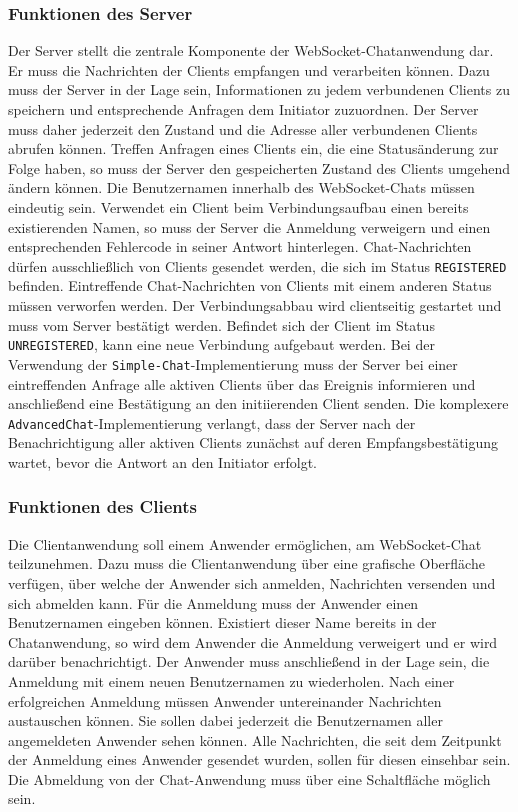 \documentclass[11pt,a4paper,titlepage]{scrartcl}
\numberwithin{equation}{section}
\begin{document}
\subsubsection*{Funktionen des Server}
Der Server stellt die zentrale Komponente der WebSocket-Chatanwendung dar. Er muss die Nachrichten der Clients empfangen und verarbeiten können. Dazu muss der Server in der Lage sein, Informationen zu jedem verbundenen Clients zu speichern und entsprechende Anfragen dem Initiator zuzuordnen. Der Server muss daher jederzeit den Zustand und die Adresse aller verbundenen Clients abrufen können. Treffen Anfragen eines Clients ein, die eine Statusänderung zur Folge haben, so muss der Server den gespeicherten Zustand des Clients umgehend ändern können. Die Benutzernamen innerhalb des WebSocket-Chats müssen eindeutig sein. Verwendet ein Client beim Verbindungsaufbau einen bereits existierenden Namen, so muss der Server die Anmeldung verweigern und einen entsprechenden Fehlercode in seiner Antwort hinterlegen. Chat-Nachrichten dürfen ausschließlich von Clients gesendet werden, die sich im Status \texttt{REGISTERED} befinden. Eintreffende Chat-Nachrichten von Clients mit einem anderen Status müssen verworfen werden. Der Verbindungsabbau wird clientseitig gestartet und muss vom Server bestätigt werden. Befindet sich der Client im Status \texttt{UNREGISTERED}, kann eine neue Verbindung aufgebaut werden. Bei der Verwendung der \texttt{Simple-Chat}-Implementierung muss der Server bei einer eintreffenden Anfrage alle aktiven Clients über das Ereignis informieren und anschließend eine Bestätigung an den initiierenden Client senden. Die komplexere \texttt{AdvancedChat}-Implementierung verlangt, dass der Server nach der Benachrichtigung aller aktiven Clients zunächst auf deren Empfangsbestätigung wartet, bevor die Antwort an den Initiator erfolgt.

\subsubsection*{Funktionen des Clients}
Die Clientanwendung soll einem Anwender ermöglichen, am WebSocket-Chat teilzunehmen. Dazu muss die Clientanwendung über eine grafische Oberfläche verfügen, über welche der Anwender sich anmelden, Nachrichten versenden und sich abmelden kann. Für die Anmeldung muss der Anwender einen Benutzernamen eingeben können. Existiert dieser Name bereits in der Chatanwendung, so wird dem Anwender die Anmeldung verweigert und er wird darüber benachrichtigt. Der Anwender muss anschließend in der Lage sein, die Anmeldung mit einem neuen Benutzernamen zu wiederholen. Nach einer erfolgreichen Anmeldung müssen Anwender untereinander Nachrichten austauschen können. Sie sollen dabei jederzeit die Benutzernamen aller angemeldeten Anwender sehen können. Alle Nachrichten, die seit dem Zeitpunkt der Anmeldung eines Anwender gesendet wurden, sollen für diesen einsehbar sein. Die Abmeldung von der Chat-Anwendung muss über eine Schaltfläche möglich sein. \\
\end{document}
